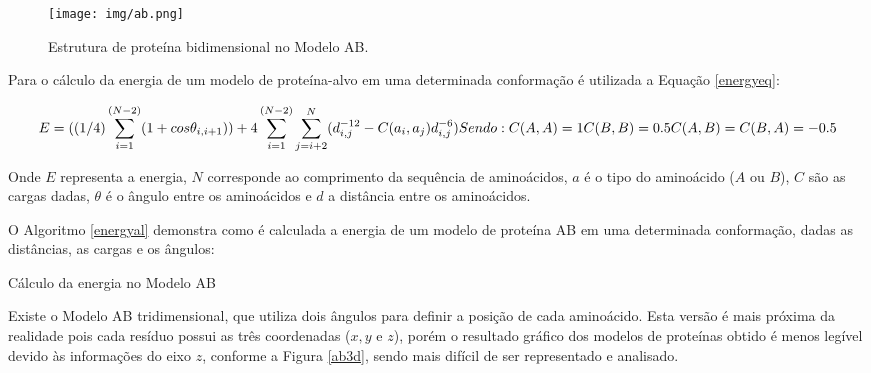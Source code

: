\documentclass[dm,ppgcomp]{texfurg}
\begin{document}
\begin{figure}[htbp]
  \centering \texttt{[image: img/ab.png]}
\caption{Estrutura de proteína bidimensional no Modelo AB.} 
\label{ab}
\end{figure}

Para o cálculo da energia de um modelo de proteína-alvo em uma determinada conformação é utilizada a Equação \ref{energyeq}:

\begin{equation}\label{energyeq}
  E=((1/4)\sum_{i=1}^{(N-2)}(1+cos\theta_{i, i+1}))+4\sum_{i=1}^{(N-2)}\sum_{j=i+2}^{N}(d^{-12}_{i, j}-C (a_{i}, a_{j})d^{-6}_{i, j})$$
Sendo:\\
C (A, A) = 1\\
C (B, B) = 0.5\\
C (A, B) = C (B, A) = -0.5\\
\end{equation}

Onde $E$ representa a energia, $N$ corresponde ao comprimento da sequência de aminoácidos, $a$ é o tipo do aminoácido ($A$ ou $B$), $C$ são as cargas dadas, $\theta$ é o ângulo entre os aminoácidos e $d$ a distância entre os aminoácidos.

O Algoritmo \ref{energyal} demonstra como é calculada a energia de um modelo de proteína AB em uma determinada conformação, dadas as distâncias, as cargas e os ângulos:

\begin{algorithm}
  \caption{Cálculo da energia no Modelo AB}\label{energyal}
  \begin{algorithmic}
  
  \ENDFOR
    \ENDFOR
  \ENDFOR
  
  \end{algorithmic}
\end{algorithm}

Existe o Modelo AB tridimensional, que utiliza dois ângulos para definir a posição de cada aminoácido. Esta versão é mais próxima da realidade pois cada resíduo possui as três coordenadas ($x, y$ e $z$), porém o resultado gráfico dos modelos de proteínas obtido é menos legível devido às informações do eixo $z$, conforme a Figura \ref{ab3d}, sendo mais difícil de ser representado e analisado.
\end{document}
